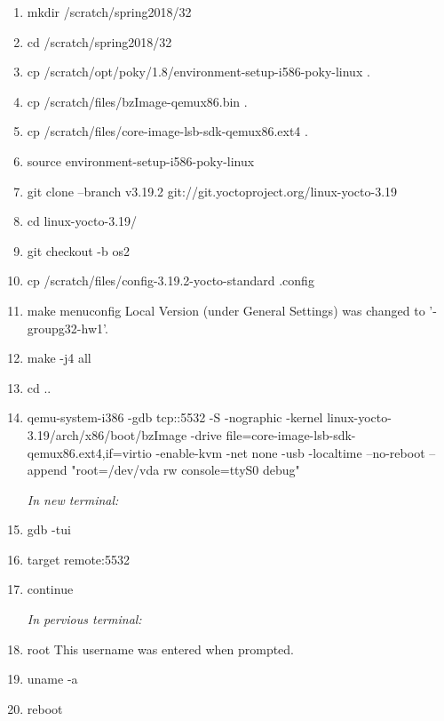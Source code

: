 \documentclass[onecolumn, draftclsnofoot,10pt, compsoc]{IEEEtran}
\begin{document}
\begin{enumerate}
    \item mkdir /scratch/spring2018/32
    \item cd /scratch/spring2018/32
    \item cp /scratch/opt/poky/1.8/environment-setup-i586-poky-linux .
    \item cp /scratch/files/bzImage-qemux86.bin .
    \item cp /scratch/files/core-image-lsb-sdk-qemux86.ext4 .
    \item source environment-setup-i586-poky-linux
    \item git clone --branch v3.19.2 git://git.yoctoproject.org/linux-yocto-3.19
    \item cd linux-yocto-3.19/
    \item git checkout -b os2
    \item cp /scratch/files/config-3.19.2-yocto-standard .config
    \item make menuconfig \newline \indent Local Version (under General Settings) was changed to '-groupg32-hw1'.
    \item make -j4 all
    \item cd ..
    \item qemu-system-i386 -gdb tcp::5532 -S -nographic -kernel linux-yocto-3.19/arch/x86/boot/bzImage -drive file=core-image-lsb-sdk-qemux86.ext4,if=virtio -enable-kvm -net none -usb -localtime --no-reboot --append "root=/dev/vda rw console=ttyS0 debug"
    
    \vspace{3mm}
    \emph{In new terminal:}
    
    \item gdb -tui
    \item target remote:5532
    \item continue
    
    \vspace{3mm}
    \emph{In pervious terminal:}
    
    \item root \newline This username was entered when prompted.
    \item uname -a
    \item reboot
\end{enumerate}


%


\end{document}
